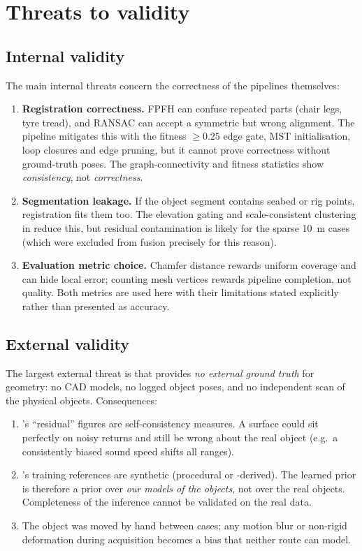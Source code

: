 \section{Threats to validity}
\label{sec:disc_threats}

\subsection{Internal validity}
The main internal threats concern the correctness of the pipelines themselves:

\begin{enumerate}
  \item \textbf{Registration correctness.} FPFH can confuse repeated parts
  (chair legs, tyre tread), and RANSAC can accept a symmetric but wrong
  alignment. The pipeline mitigates this with the fitness $\geq 0.25$ edge
  gate, MST initialisation, loop closures and edge pruning, but it cannot
  prove correctness without ground-truth poses. The graph-connectivity and
  fitness statistics show \emph{consistency}, not \emph{correctness}.
  \item \textbf{Segmentation leakage.} If the object segment contains seabed
  or rig points, registration fits them too. The elevation gating and
  scale-consistent clustering in  reduce this, but residual
  contamination is likely for the sparse 10~m cases (which were excluded from
  fusion precisely for this reason).
  \item \textbf{Evaluation metric choice.} Chamfer distance rewards uniform
  coverage and can hide local error; counting mesh vertices rewards pipeline
  completion, not quality. Both metrics are used here with their limitations
  stated explicitly rather than presented as accuracy.
\end{enumerate}

\subsection{External validity}
The largest external threat is that \suop{} provides \emph{no external
ground truth} for geometry: no CAD models, no logged object poses, and no
independent scan of the physical objects. Consequences:

\begin{enumerate}
  \item \routeA{}'s ``residual'' figures are self-consistency measures. A
  surface could sit perfectly on noisy returns and still be wrong about the
  real object (e.g.\ a consistently biased sound speed shifts all ranges).
  \item \routeB{}'s training references are synthetic (procedural or
  \routeA{}-derived). The learned prior is therefore a prior over
  \emph{our models of the objects}, not over the real objects. Completeness of
  the inference cannot be validated on the real data.
  \item The object was moved by hand between \suop{} cases; any motion blur or
  non-rigid deformation during acquisition becomes a bias that neither route
  can model.
\end{enumerate}

